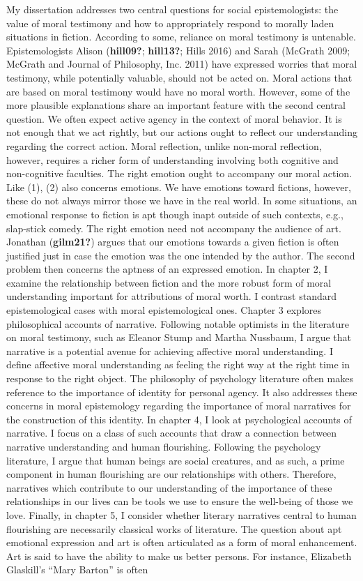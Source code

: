 \documentclass[12pt]{book}
\theoremstyle{definition}
\theoremstyle{remark}
\begin{document}
My dissertation addresses two central questions for social epistemologists: the value of moral testimony and how to appropriately respond to morally laden situations in fiction. According to some, reliance on moral testimony is untenable. Epistemologists Alison (\textbf{hill09?}; \textbf{hill13?}; Hills 2016) and Sarah (McGrath 2009; McGrath and Journal of Philosophy, Inc. 2011) have expressed worries that moral testimony, while potentially valuable, should not be acted on. Moral actions that are based on moral testimony would have no moral worth. However, some of the more plausible explanations share an important feature with the second central question. We often expect active agency in the context of moral behavior. It is not enough that we act rightly, but our actions ought to reflect our understanding regarding the correct action. Moral reflection, unlike non-moral reflection, however, requires a richer form of understanding involving both cognitive and non-cognitive faculties. The right emotion ought to accompany our moral action. Like (1), (2) also concerns emotions. We have emotions toward fictions, however, these do not always mirror those we have in the real world. In some situations, an emotional response to fiction is apt though inapt outside of such contexts, e.g., slap-stick comedy. The right emotion need not accompany the audience of art. Jonathan (\textbf{gilm21?}) argues that our emotions towards a given fiction is often justified just in case the emotion was the one intended by the author. The second problem then concerns the aptness of an expressed emotion. In chapter 2, I examine the relationship between fiction and the more robust form of moral understanding important for attributions of moral worth. I contrast standard epistemological cases with moral epistemological ones. Chapter 3 explores philosophical accounts of narrative. Following notable optimists in the literature on moral testimony, such as Eleanor Stump and Martha Nussbaum, I argue that narrative is a potential avenue for achieving affective moral understanding. I define affective moral understanding as feeling the right way at the right time in response to the right object. The philosophy of psychology literature often makes reference to the importance of identity for personal agency. It also addresses these concerns in moral epistemology regarding the importance of moral narratives for the construction of this identity. In chapter 4, I look at psychological accounts of narrative. I focus on a class of such accounts that draw a connection between narrative understanding and human flourishing. Following the psychology literature, I argue that human beings are social creatures, and as such, a prime component in human flourishing are our relationships with others. Therefore, narratives which contribute to our understanding of the importance of these relationships in our lives can be tools we use to ensure the well-being of those we love. Finally, in chapter 5, I consider whether literary narratives central to human flourishing are necessarily classical works of literature. The question about apt emotional expression and art is often articulated as a form of moral enhancement. Art is said to have the ability to make us better persons. For instance, Elizabeth Glaskill's ``Mary Barton'' is often 
\end{document}
